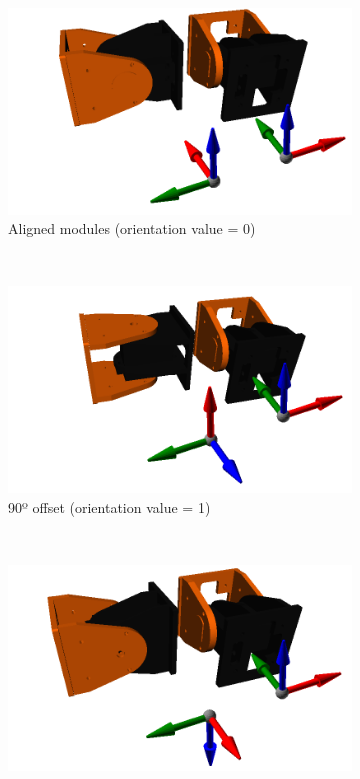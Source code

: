 \begin{figure}[h]
		\centering
        \begin{subfigure}[b]{0.35\textwidth}
                \centering
                \includegraphics[width=\textwidth]{images/Conf_example_08.png}
                \caption{Aligned modules (orientation value = 0)}
                \label{fig:config_example5}
        \end{subfigure}
        ~
        \begin{subfigure}[b]{0.35\textwidth}
                \centering
                \includegraphics[width=\textwidth]{images/Conf_example_07.png}
                \caption{90º offset (orientation value = 1)}
                \label{fig:config_example6}
        \end{subfigure}
        ~
        \begin{subfigure}[b]{0.35\textwidth}
         	   \centering
                \includegraphics[width=\textwidth]{images/Conf_example_06.png}

\end{subfigure}
\end{figure}
